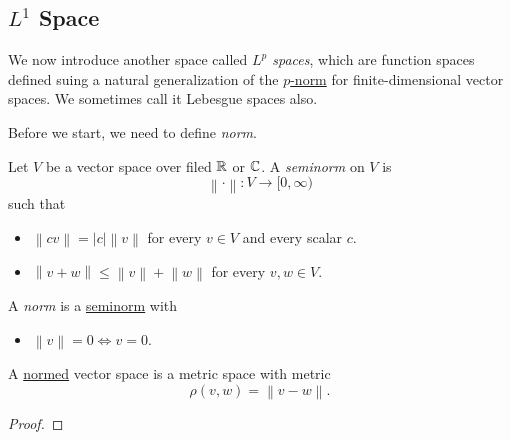 \subsection{\(L^1\) Space}
We now introduce another space called \emph{\(L^p\) spaces}, which are function spaces defined suing a natural generalization of the
\hyperref[eg:p-norm]{\(p\)-norm} for finite-dimensional vector spaces. We sometimes call it Lebesgue spaces also.

Before we start, we need to define \emph{norm}.
\begin{definition}[Seminorm]\label{def:seminorm}
	Let \(V\) be a vector space over filed \(\mathbb{\MakeUppercase{r}} \) or \(\mathbb{\MakeUppercase{c}} \).
	A \emph{seminorm} on \(V\) is
	\[
		\left\lVert \cdot\right\rVert \colon V\to [0, \infty )
	\]
	such that
	\begin{itemize}
		\item \(\left\lVert c v\right\rVert =\left\vert c \right\vert \left\lVert v\right\rVert \) for every \(v\in V\) and every scalar \(c\).
		\item \(\left\lVert  v+w\right\rVert \leq \left\lVert v\right\rVert +\left\lVert w\right\rVert \) for every \(v, w\in V\).
	\end{itemize}
\end{definition}
\begin{definition}[Norm]\label{def:norm}
	A \emph{norm} is a \hyperref[def:seminorm]{seminorm} with
	\begin{itemize}
		\item \(\left\lVert v\right\rVert = 0 \iff v = 0\).
	\end{itemize}
\end{definition}

\begin{lemma}
	A \hyperref[def:norm]{normed} vector space is a metric space with metric
	\[
		\rho (v, w) = \left\lVert v - w\right\rVert.
	\]
\end{lemma}
\begin{proof}
\end{proof}

